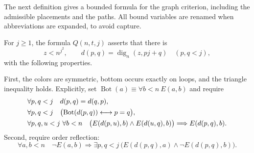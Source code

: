The next definition gives a bounded formula for the graph criterion,
including the admissible placements and the paths.  All bound variables
are renamed when abbreviations are expanded, to avoid capture.

\begin{definition}\label{q:witness-predicate}
For $j\ge1$, the formula $Q(n,t,j)$ asserts that there is
\begin{equation}\label{q:color-encoding}
 z<n^{j^2},\qquad d(p,q)=\operatorname{dig}_n(z,pj+q)\quad(p,q<j),
\end{equation}
with the following properties.

First, the colors are symmetric, bottom occurs exactly on loops, and
the triangle inequality holds.  Explicitly, set
$\operatorname{Bot}(a)\equiv\forall b<n\ E(a,b)$ and require
\begin{align}
 &\forall p,q<j\quad d(p,q)=d(q,p),\notag\\
 &\forall p,q<j\quad
        \bigl(\operatorname{Bot}(d(p,q))\longleftrightarrow p=q\bigr),
        \label{q:graph-bottom}\\
 &\forall p,q,u<j\ \forall b<n\quad
 \bigl(E(d(p,u),b)\land E(d(u,q),b)\bigr)
                       \Longrightarrow E(d(p,q),b).\notag
\end{align}
Second, require order reflection:
\begin{equation}\label{q:graph-reflect}
 \forall a,b<n\quad \neg E(a,b)\Longrightarrow
  \exists p,q<j\ \bigl(E(d(p,q),a)\land\neg E(d(p,q),b)\bigr).
\end{equation}


\end{definition}
